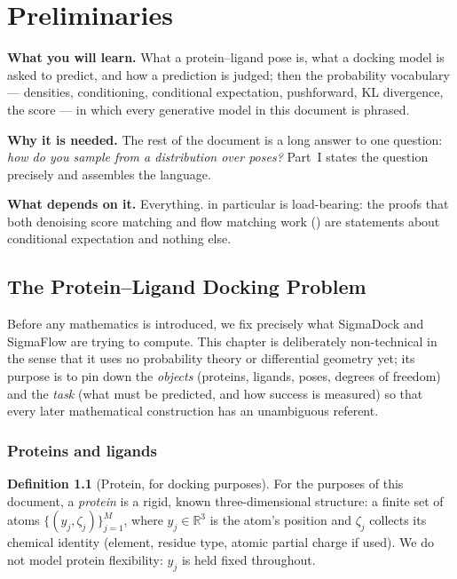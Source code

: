\documentclass[11pt,a4paper]{report}
\theoremstyle{definition}
\newtheorem{definition}[definition]{Definition}
\theoremstyle{remark}
\newcommand{\RR}{\mathbb R}
\begin{document}
\clearpage

\part{Preliminaries}


\begin{tcolorbox}[colback=gray!4,colframe=gray!55!black,
  title=Part I at a glance, fonttitle=\bfseries, breakable]
\textbf{What you will learn.} What a protein--ligand pose is, what a docking model is asked to predict, and how a prediction is judged; then the probability vocabulary --- densities, conditioning, conditional expectation, pushforward, KL divergence, the score --- in which every generative model in this document is phrased.

\textbf{Why it is needed.} The rest of the document is a long answer to one question: \emph{how do you sample from a distribution over poses?} Part~I states the question precisely and assembles the language.

\textbf{What depends on it.} Everything.  in particular is load-bearing: the proofs that both denoising score matching and flow matching work () are statements about conditional expectation and nothing else.
\end{tcolorbox}


\chapter{The Protein--Ligand Docking Problem}
\label{chap:docking}

Before any mathematics is introduced, we fix precisely what SigmaDock and
SigmaFlow are trying to compute. This chapter is deliberately non-technical
in the sense that it uses no probability theory or differential geometry
yet; its purpose is to pin down the \emph{objects} (proteins, ligands,
poses, degrees of freedom) and the \emph{task} (what must be predicted, and
how success is measured) so that every later mathematical construction has
an unambiguous referent.

\section{Proteins and ligands}

\begin{definition}[Protein, for docking purposes]
\label{def:protein}
For the purposes of this document, a \emph{protein} is a rigid, known
three-dimensional structure: a finite set of atoms $\{(y_j, \zeta_j)\}_{j=1}^{M}$,
where $y_j \in \RR^3$ is the atom's position and $\zeta_j$ collects its
chemical identity (element, residue type, atomic partial charge if used).
We do not model protein flexibility: $y_j$ is held fixed throughout.
\end{definition}
\end{document}
